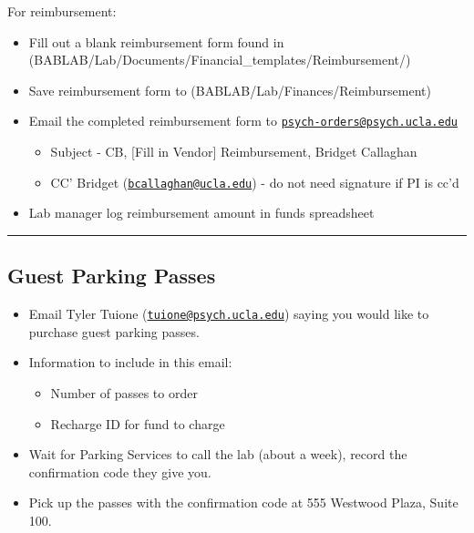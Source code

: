 \documentclass[]{book}
\providecommand{\tightlist}{%
  \setlength{\itemsep}{0pt}\setlength{\parskip}{0pt}}
\begin{document}
For reimbursement:

\begin{itemize}
\tightlist
\item
  Fill out a blank reimbursement form found in (BABLAB/Lab/Documents/Financial\_templates/Reimbursement/)
\item
  Save reimbursement form to (BABLAB/Lab/Finances/Reimbursement)
\item
  Email the completed reimbursement form to \href{mailto:psych-orders@psych.ucla.edu}{\nolinkurl{psych-orders@psych.ucla.edu}}

  \begin{itemize}
  \tightlist
  \item
    Subject - CB, {[}Fill in Vendor{]} Reimbursement, Bridget Callaghan
  \item
    CC' Bridget (\href{mailto:bcallaghan@ucla.edu}{\nolinkurl{bcallaghan@ucla.edu}}) - do not need signature if PI is cc'd
  \end{itemize}
\item
  Lab manager log reimbursement amount in funds spreadsheet
\end{itemize}

\begin{center}\rule{0.5\linewidth}{0.5pt}\end{center}

\hypertarget{guest-parking-passes}{%
\subsection{Guest Parking Passes}\label{guest-parking-passes}}

\begin{itemize}
\tightlist
\item
  Email Tyler Tuione (\href{mailto:tuione@psych.ucla.edu}{\nolinkurl{tuione@psych.ucla.edu}}) saying you would like to purchase guest parking passes.
\item
  Information to include in this email:

  \begin{itemize}
  \tightlist
  \item
    Number of passes to order
  \item
    Recharge ID for fund to charge
  \end{itemize}
\item
  Wait for Parking Services to call the lab (about a week), record the confirmation code they give you.
\item
  Pick up the passes with the confirmation code at 555 Westwood Plaza, Suite 100.
\end{itemize}
\end{document}
